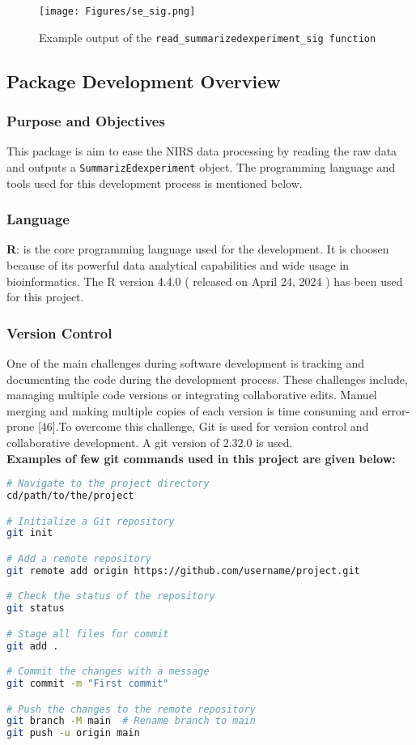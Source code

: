 \documentclass[12pt,a4paper]{report}
\begin{document}
\begin{figure}[h]
    \centering
    \texttt{[image: Figures/se\_sig.png]}
    \caption{Example output of the \texttt{read\_summarizedexperiment\_sig function}}
    \label{Figure 2}
\end{figure}

\subsection{Package Development Overview}
\subsubsection*{Purpose and Objectives}
This package is aim to ease the NIRS data processing by reading the raw data and outputs a \texttt{SummarizEdexperiment} object. The programming language and tools used for this development process is mentioned below. \\

\subsubsection*{Language}
\textbf{R}: is the core programming language used for the development. It is choosen because of its powerful data analytical capabilities and wide usage in bioinformatics. The R version 4.4.0 ( released on April 24, 2024 ) has been used for this project.


\subsubsection*{Version Control} 
One of the main challenges during software development is tracking and documenting the code during the development process. These challenges include, managing multiple code versions or integrating collaborative edits. Manuel merging and making multiple copies of each version is time consuming and error-prone [46].To overcome this challenge, Git is used for version control and collaborative development. A git version of $2.32.0$ is used.\\

\textbf{Examples of few git commands used in this project are given below:}
\begin{lstlisting}[language=bash, style=mystyle]
# Navigate to the project directory
cd/path/to/the/project

# Initialize a Git repository
git init

# Add a remote repository
git remote add origin https://github.com/username/project.git

# Check the status of the repository
git status

# Stage all files for commit
git add .

# Commit the changes with a message
git commit -m "First commit"

# Push the changes to the remote repository
git branch -M main  # Rename branch to main
git push -u origin main
\end{lstlisting}
\end{document}
